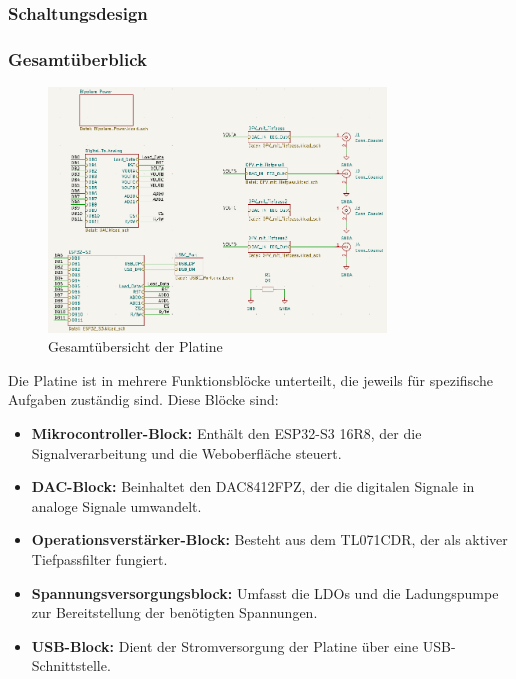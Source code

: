 \subsubsection{Schaltungsdesign}
\subsubsection{Gesamtüberblick}
\begin{figure}[H]
    \centering
    \includegraphics[width=0.8\textwidth]{bilder/Platine_gesamt.png}
    \caption{Gesamtübersicht der Platine}
    \label{fig:gesamtuebersicht}
\end{figure}
Die Platine ist in mehrere Funktionsblöcke unterteilt, die jeweils für spezifische Aufgaben zuständig sind. Diese Blöcke sind:
\begin{itemize}
    \item \textbf{Mikrocontroller-Block:} Enthält den ESP32-S3 16R8, der die Signalverarbeitung und die Weboberfläche steuert.
    \item \textbf{DAC-Block:} Beinhaltet den DAC8412FPZ, der die digitalen Signale in analoge Signale umwandelt.
    \item \textbf{Operationsverstärker-Block:} Besteht aus dem TL071CDR, der als aktiver Tiefpassfilter fungiert.
    \item \textbf{Spannungsversorgungsblock:} Umfasst die LDOs und die Ladungspumpe zur Bereitstellung der benötigten Spannungen.
    \item \textbf{USB-Block:} Dient der Stromversorgung der Platine über eine USB-Schnittstelle.
\end{itemize}



